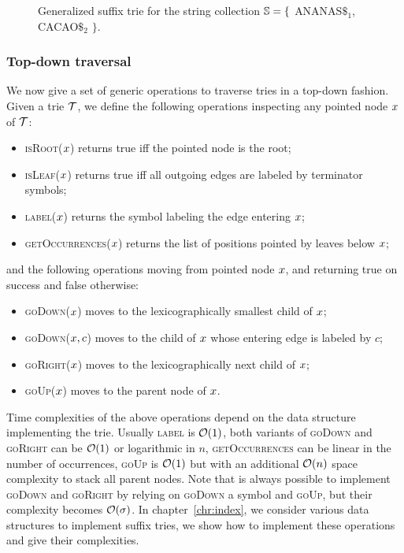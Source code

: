 \begin{figure}[h]
\caption[Example of generalized suffix trie]{Generalized suffix trie for the string collection $\mathbb {S} = \{$ {\ttfamily ANANAS$\$_1$}, {\ttfamily CACAO$\$_2$} $\}$.}
\label{fig:gstrie}
\begin{center}

\end{center}
\end{figure}

\subsubsection{Top-down traversal}

We now give a set of generic operations to traverse tries in a top-down fashion.
Given a trie $\mathcal {T}$, we define the following operations inspecting any pointed node $x$ of $\mathcal {T}$:
\begin{itemize}
\item \textsc{isRoot}($x$) returns true iff the pointed node is the root;
\item \textsc{isLeaf}($x$) returns true iff all outgoing edges are labeled by terminator symbols;
\item \textsc{label}($x$) returns the symbol labeling the edge entering $x$;
\item \textsc{getOccurrences}($x$) returns the list of positions pointed by leaves below $x$;
\end{itemize}
and the following operations moving from pointed node $x$, and returning true on success and false otherwise:
\begin{itemize}
\item \textsc{goDown}($x$) moves to the lexicographically smallest child of $x$;
\item \textsc{goDown}($x, c$) moves to the child of $x$ whose entering edge is labeled by $c$;
\item \textsc{goRight}($x$) moves to the lexicographically next child of $x$;
\item \textsc{goUp}($x$) moves to the parent node of $x$.
\end{itemize}

Time complexities of the above operations depend on the data structure implementing the trie.
Usually \textsc{label} is $\mathcal{O}(1)$, both variants of \textsc{goDown} and \textsc{goRight} can be $\mathcal{O}(1)$ or logarithmic in $n$, \textsc{getOccurrences} can be linear in the number of occurrences, \textsc{goUp} is $\mathcal{O}(1)$ but with an additional $\mathcal{O}(n)$ space complexity to stack all parent nodes.
Note that is always possible to implement \textsc{goDown} and \textsc{goRight} by relying on \textsc{goDown} a symbol and \textsc{goUp}, but their complexity becomes $\mathcal{O}(\sigma)$.
In chapter~\ref{chr:index}, we consider various data structures to implement suffix tries, we show how to implement these operations and give their complexities.

